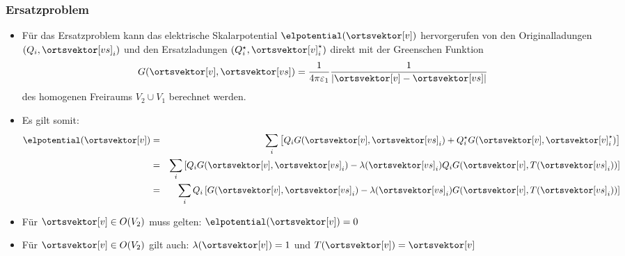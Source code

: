   \begin{frame}
    \frametitle{Ersatzproblem}
    \begin{itemize}[<+->]
    \item Für das \alert{Ersatzproblem} kann das elektrische Skalarpotential $\elpotential(\ortsvektor[v])$ hervorgerufen von den \alert{Originalladungen} $(Q_i, \ortsvektor[vs]_i)$ und den \alert{Ersatzladungen} $(Q_i^\star, \ortsvektor[v]_i^\star)$ direkt mit der \alert{Greenschen Funktion}
      \begin{equation*}
        G(\ortsvektor[v],\ortsvektor[vs]) = \frac{1}{4\pi\varepsilon_1} \frac{1}{\left|\ortsvektor[v] - \ortsvektor[vs] \right|}
      \end{equation*}
      des homogenen Freiraums $V_2\cup V_1$ berechnet werden.
    \item Es gilt somit:
      \begin{eqnarray*}
        \elpotential(\ortsvektor[v]) & = &\sum_i \left[ Q_i G(\ortsvektor[v],\ortsvektor[vs]_i) + Q_i^\star G(\ortsvektor[v],\ortsvektor[v]_i^\star)\right]\\
                                     & = &  \sum_i \left[ Q_i G(\ortsvektor[v],\ortsvektor[vs]_i) -\lambda(\ortsvektor[vs]_i) Q_i G(\ortsvektor[v],T(\ortsvektor[vs]_i))\right]\\
                                     & = & \sum_i Q_i \left[G(\ortsvektor[v],\ortsvektor[vs]_i) -\lambda(\ortsvektor[vs]_i) G(\ortsvektor[v],T(\ortsvektor[vs]_i))\right]
      \end{eqnarray*}
      \item Für $\ortsvektor[v] \in O(V_2)$ muss gelten: $\elpotential(\ortsvektor[v]) = 0$
      \item Für $\ortsvektor[v] \in O(V_2)$ gilt auch: $\lambda(\ortsvektor[v]) = 1$ und $T(\ortsvektor[v]) = \ortsvektor[v]$ 
 \end{itemize}   
    
    \end{frame}

